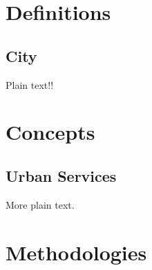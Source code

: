 \section{Definitions}


\subsection{City}


Plain text!!
	


\section{Concepts}

\subsection{Urban Services}

More plain text. 

\section{Methodologies}